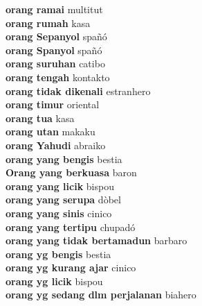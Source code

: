 \textbf{ orang ramai  } multitut \\
\textbf{ orang rumah  } kasa \\
\textbf{ orang Sepanyol  } spañó \\
\textbf{ orang Spanyol  } spañó \\
\textbf{ orang suruhan  } catibo \\
\textbf{ orang tengah  } kontakto \\
\textbf{ orang tidak dikenali  } estranhero \\
\textbf{ orang timur  } oriental \\
\textbf{ orang tua  } kasa \\
\textbf{ orang utan  } makaku \\
\textbf{ orang Yahudi  } abraiko \\
\textbf{ orang yang bengis  } bestia \\
\textbf{ Orang yang berkuasa  } baron \\
\textbf{ orang yang licik  } bispou \\
\textbf{ orang yang serupa  } dòbel \\
\textbf{ orang yang sinis  } cinico \\
\textbf{ orang yang tertipu  } chupadó \\
\textbf{ orang yang tidak bertamadun  } barbaro \\
\textbf{ orang yg bengis  } bestia \\
\textbf{ orang yg kurang ajar  } cinico \\
\textbf{ orang yg licik  } bispou \\
\textbf{ orang yg sedang dlm perjalanan  } biahero \\
